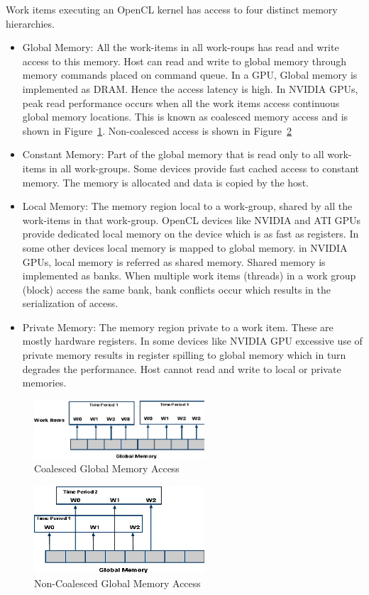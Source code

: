 \documentclass[conference]{IEEEtran}
\begin{document}
Work items executing an OpenCL kernel has access to four distinct memory hierarchies.
\begin{itemize}
\item{Global Memory: All the work-items in all work-roups has read and write access to this memory. Host can read and write to global memory
through memory commands placed on command queue. In a GPU, Global memory is implemented as DRAM. Hence the access latency is high. In NVIDIA GPUs, peak read performance occurs when all the work items access continuous global memory locations. This is known as coalesced memory access and is shown in Figure~\ref{fig:coalesced}.} Non-coalesced access is shown in Figure~\ref{fig:noncoalesced}
\item{Constant Memory: Part of the global memory that is read only to all work-items in all work-groups. Some devices provide fast cached access to constant memory. The memory is allocated and data is copied by the host.}
\item{Local Memory: The memory region local to a work-group, shared by all the work-items in that work-group. OpenCL devices like NVIDIA and ATI GPUs provide dedicated local memory on the device which is as fast as registers. In some other devices local memory is mapped to global memory. in NVIDIA GPUs, local memory is referred as shared memory. Shared memory is implemented as banks. When multiple work items (threads) in a work group (block) access the same bank, bank conflicts occur which results in the serialization of access.} 
\item{Private Memory: The memory region private to a work item. These are mostly hardware registers. In some devices like NVIDIA GPU excessive use of private memory results in register spilling to global memory which in turn degrades the performance. Host cannot read and write to local or private memories.}
\end{itemize}

\begin{figure}[!t]
\centering
\includegraphics[width=2.5in]{coalesced.eps}
\caption{Coalesced Global Memory Access}
\label{fig:coalesced}
\end{figure}


\begin{figure}[!t]
\centering
\includegraphics[width=2.5in]{noncoalesced.eps}
\caption{Non-Coalesced Global Memory Access}
\label{fig:noncoalesced}
\end{figure}
\end{document}

